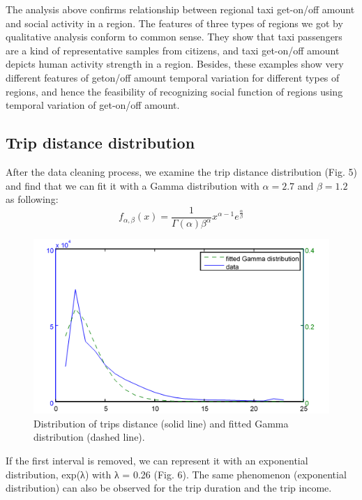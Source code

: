 \documentclass[a4paper, 10pt, conference]{ieeeconf}      %
\begin{document}
The analysis above confirms relationship between regional taxi get-on/off amount and social activity in a region. The features of three types of regions we got by qualitative analysis conform to common sense. They show that taxi passengers are a kind of representative samples from citizens, and taxi get-on/off amount depicts human activity strength in a region. Besides, these examples show very different features of geton/off amount temporal variation for different types of regions, and hence the feasibility of recognizing social function of regions using temporal variation of get-on/off amount.

\subsection{Trip distance distribution}After the data cleaning process, we examine the trip distance distribution (Fig. 5) and find that we can fit it with a Gamma distribution with $ \alpha =2.7 $ and $\beta =1.2 $ as following:
 \begin{equation}
 	f_{\alpha,\beta}(x)=\frac{1}{\Gamma(\alpha)\beta^{\alpha}}x^{\alpha-1}e^{\frac{\alpha}{\beta}}
    \label{eq:quadratic}
\end{equation}

\begin{figure}[htbp]
    \centering
    \includegraphics{fig/png5.png}
    \caption{Distribution of trips distance (solid line) and fitted Gamma distribution (dashed line). }
    \label{fig:my_png_5}
\end{figure}

If the first interval is removed, we can represent it with an exponential distribution, exp(λ) with λ = 0.26 (Fig. 6). The same phenomenon (exponential distribution) can also be observed for the trip duration and the trip income. 
\end{document}
